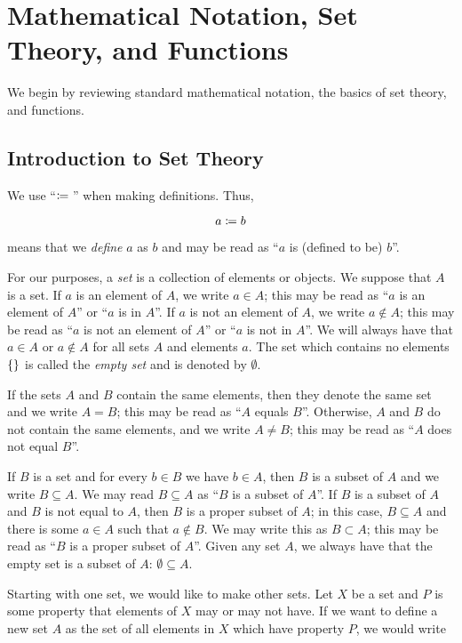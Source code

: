 \section{Mathematical Notation, Set Theory, and Functions}

We begin by reviewing standard mathematical notation,
the basics of set theory, and \glspl{function}.

\subsection{Introduction to Set Theory}

We use ``$\coloneqq{}$'' when making definitions.
Thus,

\begin{equation}
    a \coloneqq{} b
\end{equation}

\noindent
means that we \emph{define} $a$ as $b$ and may be read as
``$a$ is (defined to be) $b$''.

For our purposes, a \emph{\gls{set}} is a collection of elements or objects.
We suppose that $A$ is a \gls{set}.
If $a$ is an element of $A$, we write $a\in A$;
this may be read as ``$a$ is an element of $A$'' or ``$a$ is in $A$''.
If $a$ is not an element of $A$, we write $a\notin A$;
this may be read as ``$a$ is not an element of $A$'' or ``$a$ is not in $A$''.
We will always have that $a\in A$ or $a\notin A$
for all sets $A$ and elements $a$.
The \gls{set} which contains no elements $\left\{  \right\}$
is called the \emph{empty set}
and is denoted by $\emptyset$.

If the sets $A$ and $B$ contain the same elements,
then they denote the same set and we write $A = B$;
this may be read as ``$A$ equals $B$''.
Otherwise, $A$ and $B$ do not contain the same elements,
and we write $A\ne B$;
this may be read as ``$A$ does not equal $B$''.

If $B$ is a set and for every $b\in B$ we have $b\in A$, then $B$ is a subset
of $A$ and we write $B\subseteq A$.
We may read $B\subseteq A$ as ``$B$ is a subset of $A$''.
If $B$ is a subset of $A$ and $B$ is not equal to $A$,
then $B$ is a proper subset of $A$;
in this case, $B\subseteq A$ and there is some $a\in A$ such that $a\notin B$.
We may write this as $B\subset A$;
this may be read as ``$B$ is a proper subset of $A$''.
Given any set $A$, we always have that the empty set is a subset of $A$:
$\emptyset\subseteq A$.

Starting with one \gls{set}, we would like to make other \glspl{set}.
Let $X$ be a set and $P$ is some property that
elements of $X$ may or may not have.
If we want to define a new set $A$ as the set of all elements
in $X$ which have property $P$, we would write

